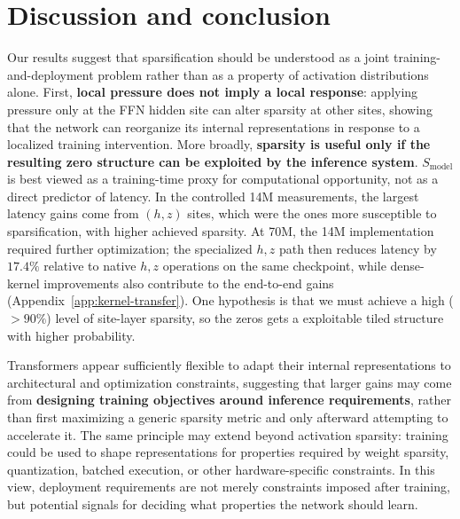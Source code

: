 \section{Discussion and conclusion}
\label{sec:conclusion}

Our results suggest that sparsification should be understood as a joint training-and-deployment problem rather than as a property of activation distributions alone. First, \textbf{local pressure does not imply a local response}: applying pressure only at the FFN hidden site can alter sparsity at other sites, showing that the network can reorganize its internal representations in response to a localized training intervention. More broadly, \textbf{sparsity is useful only if the resulting zero structure can be exploited by the inference system}. $S_{\mathrm{model}}$ is best viewed as a training-time proxy for computational opportunity, not as a direct predictor of latency. In the controlled 14M measurements, the largest latency gains come from $(h,z)$ sites, which were the ones more susceptible to sparsification, with higher achieved sparsity. At 70M, the 14M implementation required further optimization; the specialized $h,z$ path then reduces latency by $17.4\%$ relative to native $h,z$ operations on the same checkpoint, while dense-kernel improvements also contribute to the end-to-end gains (Appendix~\ref{app:kernel-transfer}). One hypothesis is that we must achieve a high ($>90\%$) level of site-layer sparsity, so the zeros gets a exploitable tiled structure with higher probability.

Transformers appear sufficiently flexible to adapt their internal representations to architectural and optimization constraints, suggesting that larger gains may come from \textbf{designing training objectives around inference requirements}, rather than first maximizing a generic sparsity metric and only afterward attempting to accelerate it. The same principle may extend beyond activation sparsity: training could be used to shape representations for properties required by weight sparsity, quantization, batched execution, or other hardware-specific constraints. In this view, deployment requirements are not merely constraints imposed after training, but potential signals for deciding what properties the network should learn.

